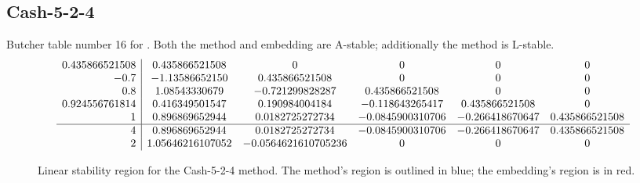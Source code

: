 \documentclass[letterpaper,10pt,english]{sphinxmanual}
\begin{document}
\subsection{Cash-5-2-4}
\label{Butcher:butcher-cash-5-2-4}\label{Butcher:cash-5-2-4}
Butcher table number 16
for {\hyperref[c_interface/User_callable:ARKodeSetIRKTableNum]{}}.  Both the
method and embedding are A-stable; additionally the method is L-stable.
\begin{gather}
\begin{split}\begin{array}{r|ccccc}
  0.435866521508 & 0.435866521508 & 0 & 0 & 0 & 0 \\
  -0.7 & -1.13586652150 & 0.435866521508 & 0 & 0 & 0 \\
  0.8 & 1.08543330679 & -0.721299828287 & 0.435866521508 & 0 & 0 \\
  0.924556761814 & 0.416349501547 & 0.190984004184 & -0.118643265417 & 0.435866521508 & 0 \\
  1 & 0.896869652944 & 0.0182725272734 & -0.0845900310706 & -0.266418670647 & 0.435866521508 \\
  \hline
  4 & 0.896869652944 & 0.0182725272734 & -0.0845900310706 & -0.266418670647 & 0.435866521508 \\
  2 & 1.05646216107052 & -0.0564621610705236 & 0 & 0 & 0
\end{array}\end{split}\notag
\end{gather}\begin{figure}[htbp]
\centering
\capstart

\caption{Linear stability region for the Cash-5-2-4 method.  The method's
region is outlined in blue; the embedding's region is in red.}\end{figure}
\end{document}
